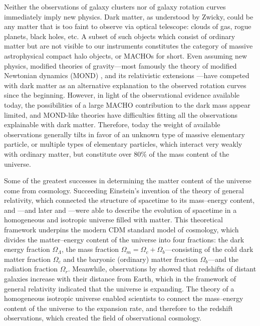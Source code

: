 \documentclass[b5paper, 10pt, twoside]{book}
\begin{document}
Neither the observations of galaxy clusters nor of galaxy rotation curves immediately imply new physics. Dark matter, as understood by Zwicky, could be any matter that is too faint to observe via optical telescope: clouds of gas, rogue planets, black holes, etc. A subset of such objects which consist of ordinary matter but are not visible to our instruments constitutes the category of massive astrophysical compact halo objects, or MACHOs for short. Even assuming new physics, modified theories of gravity---most famously the theory of modified Newtonian dynamics (MOND) \parencite{Milgrom1983}, and its relativistic extensions \parencites{Bekenstein2004, Milgrom2009, SkordisZlosnik2021}---have competed with dark matter as an alternative explanation to the observed rotation curves since the beginning. However, in light of the observational evidence available today, the possibilities of a large MACHO contribution to the dark mass appear limited, and MOND-like theories have difficulties fitting all the observations explainable with dark matter. Therefore, today the weight of available observations generally tilts in favor of an unknown type of massive elementary particle, or multiple types of elementary particles, which interact very weakly with ordinary matter, but constitute over 80\% of the mass content of the universe.

Some of the greatest successes in determining the matter content of the universe come from cosmology. Succeeding Einstein's invention of the theory of general relativity, which connected the structure of spacetime to its mass--energy content, \textcites{Friedmann1922, Friedmann1924} and \textcite{Lemaitre1927}---and later \textcites{Robertson1935, Robertson1936a, Robertson1936b} and \textcite{Walker1937}---were able to describe the evolution of spacetime in a homogeneous and isotropic universe filled with matter. This theoretical framework underpins the modern \textLambda{}CDM standard model of cosmology, which divides the matter--energy content of the universe into four fractions: the dark energy fraction $\Omega_\Lambda$, the mass fraction $\Omega_m=\Omega_c+\Omega_b$---consisting of the cold dark matter fraction $\Omega_c$ and the baryonic (ordinary) matter fraction $\Omega_b$---and the radiation fraction $\Omega_r$. Meanwhile, observations by \textcites{Slipher1917, Wirtz1922, Wirtz1924, Hubble1929} showed that redshifts of distant galaxies increase with their distance from Earth, which in the framework of general relativity indicated that the universe is expanding. The theory of a homogeneous isotropic universe enabled scientists to connect the mass--energy content of the universe to the expansion rate, and therefore to the redshift observations, which created the field of observational cosmology.
\end{document}

